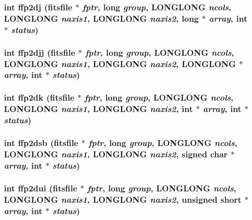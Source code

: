 \subsubsection{\setlength{\rightskip}{0pt plus 5cm}int ffp2dj (\bf{fitsfile} $\ast$ {\em fptr}, long {\em group}, \bf{LONGLONG} {\em ncols}, \bf{LONGLONG} {\em naxis1}, \bf{LONGLONG} {\em naxis2}, long $\ast$ {\em array}, int $\ast$ {\em status})}\label{fitsio__64_8h_bedbc492a2862dcbe85415d0f5963a92}


\subsubsection{\setlength{\rightskip}{0pt plus 5cm}int ffp2djj (\bf{fitsfile} $\ast$ {\em fptr}, long {\em group}, \bf{LONGLONG} {\em ncols}, \bf{LONGLONG} {\em naxis1}, \bf{LONGLONG} {\em naxis2}, \bf{LONGLONG} $\ast$ {\em array}, int $\ast$ {\em status})}\label{fitsio__64_8h_e377ad35a13d57c75f0f3e0f27be7e39}


\subsubsection{\setlength{\rightskip}{0pt plus 5cm}int ffp2dk (\bf{fitsfile} $\ast$ {\em fptr}, long {\em group}, \bf{LONGLONG} {\em ncols}, \bf{LONGLONG} {\em naxis1}, \bf{LONGLONG} {\em naxis2}, int $\ast$ {\em array}, int $\ast$ {\em status})}\label{fitsio__64_8h_5cd35b8cecc698e509678e88cff3c92c}


\subsubsection{\setlength{\rightskip}{0pt plus 5cm}int ffp2dsb (\bf{fitsfile} $\ast$ {\em fptr}, long {\em group}, \bf{LONGLONG} {\em ncols}, \bf{LONGLONG} {\em naxis1}, \bf{LONGLONG} {\em naxis2}, signed char $\ast$ {\em array}, int $\ast$ {\em status})}\label{fitsio__64_8h_e6a70017924d08f130af5f122d7b610e}


\subsubsection{\setlength{\rightskip}{0pt plus 5cm}int ffp2dui (\bf{fitsfile} $\ast$ {\em fptr}, long {\em group}, \bf{LONGLONG} {\em ncols}, \bf{LONGLONG} {\em naxis1}, \bf{LONGLONG} {\em naxis2}, unsigned short $\ast$ {\em array}, int $\ast$ {\em status})}\label{fitsio__64_8h_35a8533785911cfd707b4ec578f431b0}


